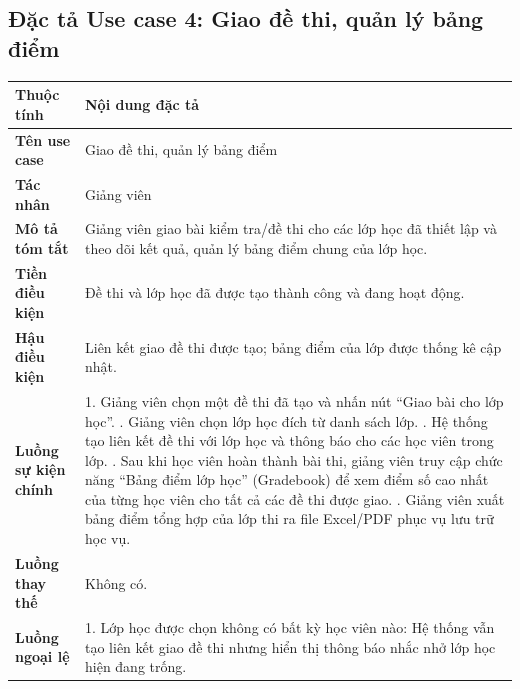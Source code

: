 \documentclass[../DoAn.tex]{subfiles}
\begin{document}
\subsection{Đặc tả Use case 4: Giao đề thi, quản lý bảng điểm}
\nopagebreak
\begingroup
\centering
\fontsize{11pt}{14pt}\selectfont
\begin{tabular}{|p{3.2cm}|p{10.8cm}|}
\hline
\textbf{Thuộc tính} & \textbf{Nội dung đặc tả} \\ \hline
\textbf{Tên use case} & Giao đề thi, quản lý bảng điểm \\ \hline
\textbf{Tác nhân} & Giảng viên \\ \hline
\textbf{Mô tả tóm tắt} & Giảng viên giao bài kiểm tra/đề thi cho các lớp học đã thiết lập và theo dõi kết quả, quản lý bảng điểm chung của lớp học. \\ \hline
\textbf{Tiền điều kiện} & Đề thi và lớp học đã được tạo thành công và đang hoạt động. \\ \hline
\textbf{Hậu điều kiện} & Liên kết giao đề thi được tạo; bảng điểm của lớp được thống kê cập nhật. \\ \hline
\textbf{Luồng sự kiện chính} & 
1. Giảng viên chọn một đề thi đã tạo và nhấn nút ``Giao bài cho lớp học''. \newline
2. Giảng viên chọn lớp học đích từ danh sách lớp. \newline
3. Hệ thống tạo liên kết đề thi với lớp học và thông báo cho các học viên trong lớp. \newline
4. Sau khi học viên hoàn thành bài thi, giảng viên truy cập chức năng ``Bảng điểm lớp học'' (Gradebook) để xem điểm số cao nhất của từng học viên cho tất cả các đề thi được giao. \newline
5. Giảng viên xuất bảng điểm tổng hợp của lớp thi ra file Excel/PDF phục vụ lưu trữ học vụ. \\ \hline
\textbf{Luồng thay thế} & Không có. \\ \hline
\textbf{Luồng ngoại lệ} & 
1. Lớp học được chọn không có bất kỳ học viên nào: Hệ thống vẫn tạo liên kết giao đề thi nhưng hiển thị thông báo nhắc nhở lớp học hiện đang trống. \\ \hline
\end{tabular}
\label{table:uc_assign_exam_gradebook}
\par
\endgroup
\end{document}
